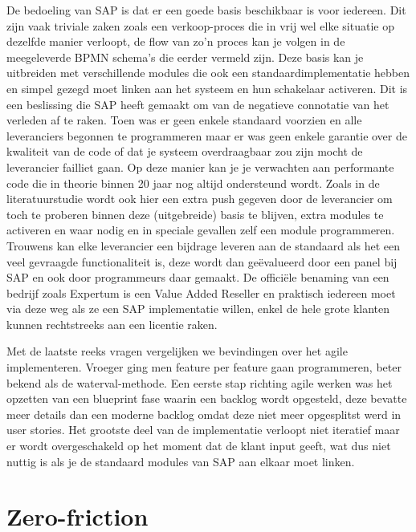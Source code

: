 De bedoeling van SAP is dat er een goede basis beschikbaar is voor iedereen. Dit zijn vaak triviale zaken zoals een verkoop-proces die in vrij wel elke situatie op dezelfde manier verloopt, de flow van zo'n proces kan je volgen in de meegeleverde BPMN schema's die eerder vermeld zijn. Deze basis kan je uitbreiden met verschillende modules die ook een standaardimplementatie hebben en simpel gezegd moet linken aan het systeem en hun schakelaar activeren. Dit is een beslissing die SAP heeft gemaakt om van de negatieve connotatie van het verleden af te raken. Toen was er geen enkele standaard voorzien en alle leveranciers begonnen te programmeren maar er was geen enkele garantie over de kwaliteit van de code of dat je systeem overdraagbaar zou zijn mocht de leverancier failliet gaan. Op deze manier kan je je verwachten aan performante code die in theorie binnen 20 jaar nog altijd ondersteund wordt. Zoals in de literatuurstudie wordt ook hier een extra push gegeven door de leverancier om toch te proberen binnen deze (uitgebreide) basis te blijven, extra modules te activeren en waar nodig en in speciale gevallen zelf een module programmeren. Trouwens kan elke leverancier een bijdrage leveren aan de standaard als het een veel gevraagde functionaliteit is, deze wordt dan geëvalueerd door een panel bij SAP en ook door programmeurs daar gemaakt. De officiële benaming van een bedrijf zoals Expertum is een Value Added Reseller en praktisch iedereen moet via deze weg als ze een SAP implementatie willen, enkel de hele grote klanten kunnen rechtstreeks aan een licentie raken.

Met de laatste reeks vragen vergelijken we bevindingen over het agile implementeren. Vroeger ging men feature per feature gaan programmeren, beter bekend als de waterval-methode. Een eerste stap richting agile werken was het opzetten van een blueprint fase waarin een backlog wordt opgesteld, deze bevatte meer details dan een moderne backlog omdat deze niet meer opgesplitst werd in user stories. Het grootste deel van de implementatie verloopt niet iteratief maar er wordt overgeschakeld op het moment dat de klant input geeft, wat dus niet nuttig is als je de standaard modules van SAP aan elkaar moet linken.


\section{Zero-friction}

